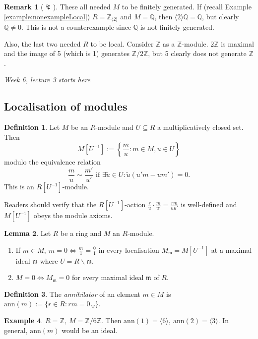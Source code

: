 \documentclass[a4paper]{article}
\newcommand{\la}{\langle}
\newcommand{\ra}{\rangle}
\newcommand{\Z}{\mathbb Z}
\newcommand{\Q}{\mathbb Q}
\newcommand{\m}{\mathfrak m}
\newcommand{\ann}{\text{ann}}
\theoremstyle{definition}
\newtheorem{defn}{Definition}[subsection]
\newtheorem{lemma}[defn]{Lemma}
\newtheorem{example}[defn]{Example}
\newtheorem*{remark}{Remark}
\begin{document}
\begin{remark}[$\lightning$]
These all needed $M$ to be finitely generated. If (recall Example \ref{example:nonexampleLocal}) $R=\Z_{\la 2\ra}$ and $M=\Q$, then $\la 2\ra \Q=\Q$, but clearly $\Q\neq 0$. This is not a counterexample since $\Q$ is not finitely generated.

Also, the last two needed $R$ to be local. Consider $\Z$ as a $\Z$-module. $2\Z$ is maximal and the image of 5 (which is 1) generates $\Z/2\Z$, but 5 clearly does not generate $\Z$.
\end{remark}

\begin{flushright}
\textit{Week 6, lecture 3 starts here}
\end{flushright}

\subsection{Localisation of modules}
\begin{defn}
Let $M$ be an $R$-module and $U\subseteq R$ a multiplicatively closed set. Then
\[
M\left[U^{-1}\right]:=\left\{\frac{m}{u}:m\in M,u\in U\right\}
\]
modulo the equivalence relation
\[
\frac{m}{u}\sim \frac{m'}{u'} \text{ if } \exists \widetilde u\in U:\widetilde u (u'm-um')=0.
\]
This is an $R\left[U^{-1}\right]$-module.
\end{defn}
Readers should verify that the $R\left[U^{-1}\right]$-action $\frac{r}{u}\cdot \frac{m}{u'}=\frac{rm}{uu'}$ is well-defined and $M\left[U^{-1}\right]$ obeys the module axioms.

\begin{lemma}
Let $R$ be a ring and $M$ an $R$-module.
\begin{enumerate}
\item If $m\in M,\ m=0 \Leftrightarrow \frac{m}{1}= \frac{0}{1}$ in every localisation $M_{\m}=M[U^{-1}]$ at a maximal ideal $\m$ where $U=R\backslash \m$.
\item $M=0 \Leftrightarrow M_{\m}=0$ for every maximal ideal $\m$ of $R$. 
\end{enumerate}
\end{lemma}

\begin{defn}
The \textit{annihilator} of an element $m\in M$ is $\ann(m):=\{r\in R:rm=0_M\}$.
\end{defn}
\begin{example}
$R=\Z,\ M=\Z/6\Z$. Then $\ann(1)=\la 6\ra,\ \ann(2)=\la 3\ra$. In general, $\ann(m)$ would be an ideal.
\end{example}
\end{document}
